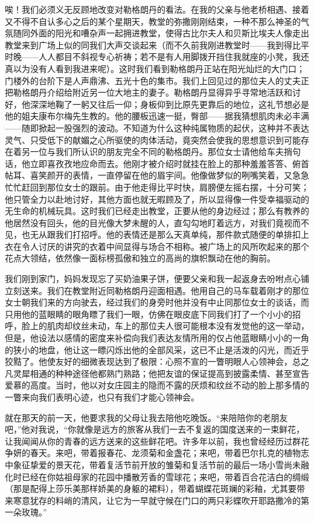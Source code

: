 \par 唉！我们必须义无反顾地改变对勒格朗丹的看法。在我的父亲与他老桥相遇、接着又不得不自认多心之后的某个星期天，教堂的弥撒刚刚结束，一种不那么神圣的气氛随同外面的阳光和嘈杂声一起拥进教堂，使得古比尔夫人和贝斯比埃夫人像走出教堂来到广场上似的同我们大声交谈起来（而不久前我刚进教堂时——我到得比平时晚——人人都目不斜视专心祈祷；若不是有人用脚拨开挡住我就座的小凳，我还真以为没有人看到我进来呢）。这时我们看到勒格朗丹正站在阳光灿烂的大门口；门楼外的台阶下是人声鼎沸、五光十色的集市。我们上回见过的那位夫人的丈夫正把勒格朗丹介绍给附近另一位大地主的妻子。勒格朗丹显得异乎寻常地活跃和讨好，他深深地鞠了一躬又往后一仰；身板仰到比原先更靠后的地位，这礼节想必是他的姐夫康布尔梅先生教的。他的腰板迅速一挺，臀部——据我猜想肌肉未必丰满——随即掀起一股强烈的波动。不知道为什么这种纯属物质的起伏，这种并不表达灵气、只受低下的献媚之心所驱使的肉体活动，竟突然会使我的思想意识到可能存在着另一位与我们所认识的朋友完全不同的勒格朗丹。那位女士请他给车夫捎句话，他立即喜孜孜地应命而去。他刚才被介绍时就挂在脸上的那种羞羞答答、俯首帖耳、喜笑颜开的表情，一直停留在他的眉宇间。他像做梦似的咧嘴笑着，又急急忙忙赶回到那位女士的跟前。由于他走得比平时快，肩膀便左摇右摆，十分可笑；他只管全力以赴地讨好，其他方面也就无暇顾及了，所以显得像一件受幸福驱动的无生命的机械玩具。这时我们已经走出教堂，正要从他的身边经过；那么有教养的他居然没有回头，他的目光像大梦未醒的人，直勾勾地盯着远方，对我们竟视而不见，也无从跟我们打招呼。他的表情还是那么天真单纯，那件款式随便的单排扣上衣在令人讨厌的讲究的衣着中间显得与场合不相称。被广场上的风所吹起来的那个花点大领结，依然像一面标榜孤傲和独立的高尚的旗帜飘动在他的胸前。
\par 我们刚到家门，妈妈发现忘了买奶油果子饼，便要父亲和我一起返身去吩咐点心铺立刻送来。我们在教堂附近同勒格朗丹迎面相遇。他用自己的马车载着刚才的那位女士朝我们来的方向驶去，经过我们的身旁时他并没有中止同那位女士的谈话，而只用他的蓝眼睛的眼角瞟了我们一眼，仿佛在眼皮底下同我们打了一个小小的招呼，脸上的肌肉却纹丝未动，车上的那位夫人很可能根本没有发觉他的这一举动，但是，他设法以感情的密度来补偿向我们表达友情所用的仅占他蓝眼睛小小的一角的狭小的地盘，他让这一瞟闪烁出他的全部风采，这已不止是活泼的闪光，而近乎狡黠了。他使友好的细微表现达到了极限：心照不宣的一瞥明眼人心领神会，总之凡灵犀相通的种种途径他都熟门熟路；他把友谊的保证提高到披露柔情、甚至宣告爱慕的高度。当时，他以对女庄园主的隐而不露的厌烦和纹丝不动的脸上那多情的一瞥来向我们表明心迹，也只有我们才能心领神会。
\par 就在那天的前一天，他要求我的父母让我去陪他吃晚饭。“来陪陪你的老朋友吧，”他对我说，“你就像是远方的旅客从我们一去不复返的国度送来的一束鲜花，让我闻闻从你的青春的远方送来的这些鲜花吧。许多年以前，我也曾经经历过群花争妍的春天。来吧，带着报春花、龙须菊和金盏花；来吧，带着巴尔扎克的植物志中象征挚爱的景天花，带着复活节前开放的雏菊和复活节前的最后一场小雪尚未融化时已经在你姑祖母家的花园中播散芳香的雪球花；来吧，带着百合花洁白的绸缎（那是配得上莎乐美那样娇美的身躯的裙料），带着蝴蝶花斑斓的彩釉，尤其要带来寒意犹存的料峭的清风，让它为一早就守候在门口的两只彩蝶吹开耶路撒冷的第一朵玫瑰。”
